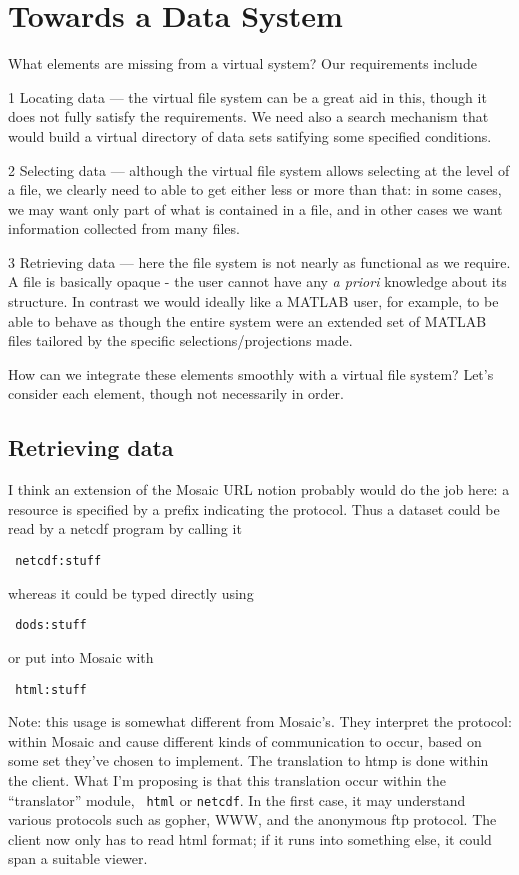 \section{Towards a Data System}

What elements are missing from a virtual system? Our requirements
include 
\item{1} Locating data --- the virtual file system can be a great aid
in this, though it does not fully satisfy the requirements. We need
also a search mechanism that would build a virtual directory of data
sets satifying some specified conditions.
\item{2} Selecting data --- although the virtual file system allows
selecting at the level of a file, we clearly need to able to get
either less or more than that: in some cases, we may want only part of
what is contained in a file, and in other cases we want information
collected from many files.
\item{3} Retrieving data --- here the file system is not nearly as
functional as we require. A file is basically opaque - the user cannot
have any {\sl a priori} knowledge about its structure. In contrast we
would ideally like a MATLAB user, for example, to be able to behave as
though the entire system were an extended set of MATLAB files tailored
by the specific selections/projections made.

\ni How can we integrate these elements smoothly with a virtual file
system? Let's consider each element, though not necessarily in order.

\subsection{Retrieving data}

I think an extension of the Mosaic URL notion probably would do the
job here: a resource is specified by a prefix indicating the protocol.
Thus a dataset could be read by a netcdf program by calling it

{\tt
netcdf:stuff
}

\ni whereas it could be typed directly using

{\tt
dods:stuff
}

\ni or put into Mosaic with

{\tt
html:stuff
}

\ni Note: this usage is somewhat different from Mosaic's. They
interpret the protocol: within Mosaic and cause different kinds of
communication to occur, based on some set they've chosen to implement.
The translation to htmp is done within the client. What I'm proposing
is that this translation occur within the ``translator'' module, {\tt
html} or {\tt netcdf}. In the first case, it may understand various
protocols such as gopher, WWW, and the anonymous ftp protocol. The
client now only has to read html format; if it runs into something
else, it could span a suitable viewer.

